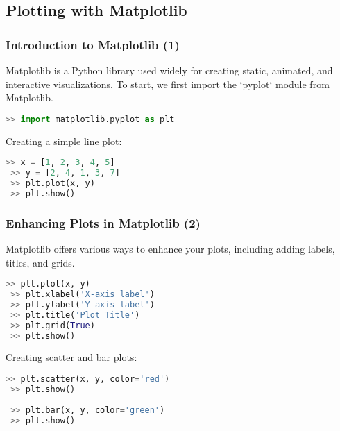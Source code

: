 \subsection*{Plotting with Matplotlib}
\begin{frame}[fragile]
  \frametitle{Introduction to Matplotlib (1)}
  Matplotlib is a Python library used widely for creating static, animated, and interactive visualizations. To start, we first import the `pyplot` module from Matplotlib.\pause
  
  \begin{lstlisting}[language=Python]
 >> import matplotlib.pyplot as plt
  \end{lstlisting}\pause
  
  Creating a simple line plot:
  \begin{lstlisting}[language=Python]
 >> x = [1, 2, 3, 4, 5]
 >> y = [2, 4, 1, 3, 7]
 >> plt.plot(x, y)
 >> plt.show()
  \end{lstlisting}
\end{frame}

\begin{frame}[fragile]
  \frametitle{Enhancing Plots in Matplotlib (2)}
  Matplotlib offers various ways to enhance your plots, including adding labels, titles, and grids.\pause

  \begin{lstlisting}[language=Python]
 >> plt.plot(x, y)
 >> plt.xlabel('X-axis label')
 >> plt.ylabel('Y-axis label')
 >> plt.title('Plot Title')
 >> plt.grid(True)
 >> plt.show()
  \end{lstlisting}\pause

  Creating scatter and bar plots:
  \begin{lstlisting}[language=Python]
 >> plt.scatter(x, y, color='red')
 >> plt.show()
 
 >> plt.bar(x, y, color='green')
 >> plt.show()
  \end{lstlisting}
\end{frame}

